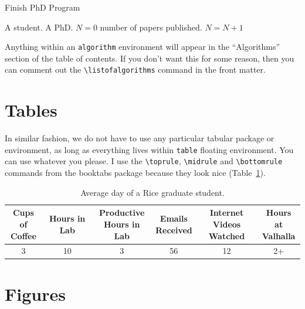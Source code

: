 \documentclass[12pt]{ruthesis}
\begin{document}
\begin{algorithm}[H]
   \caption{Finish PhD Program}
   \label{alg:graduation}
\begin{algorithmic}
    A student.
    A PhD.
   \STATE $N = 0$ number of papers published.
      \STATE $N = N + 1$
   \ENDWHILE
\end{algorithmic}
\end{algorithm}

Anything within an \verb_algorithm_ environment will appear in the ``Algorithms'' section of the table of contents. If you don't want this for some reason, then you can comment out the \verb_\listofalgorithms_ command in the front matter. 


\section{Tables}

In similar fashion, we do not have to use any particular tabular package or environment, as long as everything lives within \verb_table_ floating environment. You can use whatever you please. I use the \verb_\toprule_, \verb_\midrule_ and \verb_\bottomrule_ commands from the booktabs package because they look nice (Table~\ref{tab:day}).

\begin{table}
\caption{Average day of a Rice graduate student.}
\vspace{2mm}
  \centering
  \begin{tabular}{ c c c c c c}
\toprule
\makecell{Cups of \\Coffee} & Hours in Lab & \makecell{Productive\\ Hours in Lab} & \makecell{Emails \\Received} & \makecell{Internet Videos\\ Watched} & \makecell{Hours at\\ Valhalla} \\
\midrule
3 & 10 & 3 & 56 & 12 & 2+\\
\bottomrule
\end{tabular}
\vspace{-0.2cm}
\label{tab:day}
\vspace{-0.2cm}
\end{table}

\section{Figures}
\end{document}
